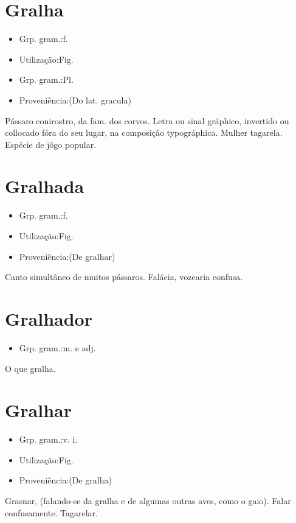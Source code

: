 \section{Gralha}
\begin{itemize}
\item {Grp. gram.:f.}
\end{itemize}
\begin{itemize}
\item {Utilização:Fig.}
\end{itemize}
\begin{itemize}
\item {Grp. gram.:Pl.}
\end{itemize}
\begin{itemize}
\item {Proveniência:(Do lat. \textunderscore gracula\textunderscore )}
\end{itemize}
Pássaro conirostro, da fam. dos corvos.
Letra ou sinal gráphico, invertido ou collocado fóra do seu lugar, na composição typográphica.
Mulher tagarela.
Espécie de jôgo popular.
\section{Gralhada}
\begin{itemize}
\item {Grp. gram.:f.}
\end{itemize}
\begin{itemize}
\item {Utilização:Fig.}
\end{itemize}
\begin{itemize}
\item {Proveniência:(De \textunderscore gralhar\textunderscore )}
\end{itemize}
Canto simultâneo de muitos pássaros.
Falácia, vozearia confusa.
\section{Gralhador}
\begin{itemize}
\item {Grp. gram.:m.  e  adj.}
\end{itemize}
O que gralha.
\section{Gralhar}
\begin{itemize}
\item {Grp. gram.:v. i.}
\end{itemize}
\begin{itemize}
\item {Utilização:Fig.}
\end{itemize}
\begin{itemize}
\item {Proveniência:(De \textunderscore gralha\textunderscore )}
\end{itemize}
Grasnar, (falando-se da gralha e de algumas outras aves, como o gaio).
Falar confusamente.
Tagarelar.
